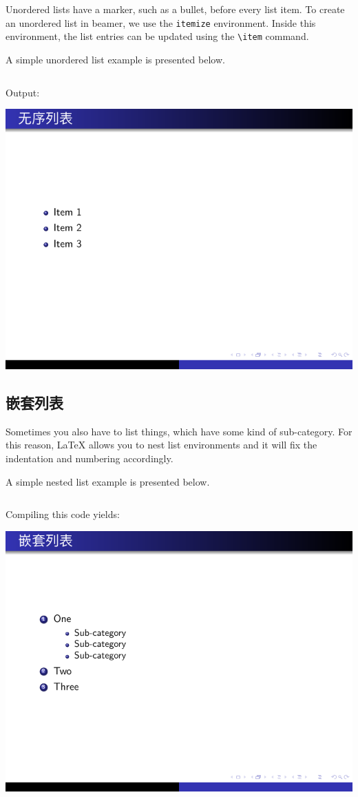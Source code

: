 Unordered lists have a marker, such as a bullet, before every list item. To create an unordered list in beamer, we use the \verb|itemize| environment. Inside this environment, the list entries can be updated using the \verb|\item| command.

A simple unordered list example is presented below.

\inputminted[linenos=true]{latex}{examples/beamer/beamerlist02.tex}

Output:

\includegraphics{examples/beamer/beamerlist02.pdf}

\subsection{嵌套列表}

Sometimes you also have to list things, which have some kind of sub-category. For this reason, LaTeX allows you to nest list environments and it will fix the indentation and numbering accordingly.

A simple nested list example is presented below.

\inputminted[linenos=true]{latex}{examples/beamer/beamerlist03.tex}

Compiling this code yields:

\includegraphics{examples/beamer/beamerlist03.pdf}


